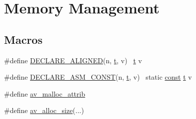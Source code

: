 \hypertarget{group__lavu__mem}{}\section{Memory Management}
\label{group__lavu__mem}
\subsection*{Macros}
\begin{DoxyCompactItemize}
\item 
\#define \hyperlink{group__lavu__mem_gacd808cbec01f20997018da3e564fdd01}{D\+E\+C\+L\+A\+R\+E\+\_\+\+A\+L\+I\+G\+N\+ED}(n,  \hyperlink{octave__test_8m_aaccc9105df5383111407fd5b41255e23}{t},  v)        ~\hyperlink{octave__test_8m_aaccc9105df5383111407fd5b41255e23}{t} v
\item 
\#define \hyperlink{group__lavu__mem_gad6a6bcb1a93c42bdc22e544c23f5cdb9}{D\+E\+C\+L\+A\+R\+E\+\_\+\+A\+S\+M\+\_\+\+C\+O\+N\+ST}(n,  \hyperlink{octave__test_8m_aaccc9105df5383111407fd5b41255e23}{t},  v)    ~static \hyperlink{getopt1_8c_a2c212835823e3c54a8ab6d95c652660e}{const} \hyperlink{octave__test_8m_aaccc9105df5383111407fd5b41255e23}{t} v
\item 
\#define \hyperlink{group__lavu__mem_gad48ff724186ef4e602ae7a2547e4287c}{av\+\_\+malloc\+\_\+attrib}
\item 
\#define \hyperlink{group__lavu__mem_gad7ff928d462d1a61b37baa70bf13e0e3}{av\+\_\+alloc\+\_\+size}(...)
\end{DoxyCompactItemize}

